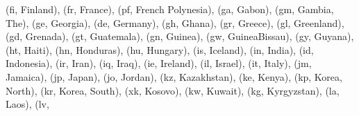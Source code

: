 \documentclass[letterpaper,10pt,english]{sphinxmanual}
\begin{document}
\begin{fulllineitems}
\begin{fulllineitems}
(\textquotesingle{}fi\textquotesingle{}, \textquotesingle{}Finland\textquotesingle{}), (\textquotesingle{}fr\textquotesingle{}, \textquotesingle{}France\textquotesingle{}), (\textquotesingle{}pf\textquotesingle{}, \textquotesingle{}French Polynesia\textquotesingle{}), (\textquotesingle{}ga\textquotesingle{}, \textquotesingle{}Gabon\textquotesingle{}), (\textquotesingle{}gm\textquotesingle{}, \textquotesingle{}Gambia, The\textquotesingle{}), (\textquotesingle{}ge\textquotesingle{}, \textquotesingle{}Georgia\textquotesingle{}), (\textquotesingle{}de\textquotesingle{}, \textquotesingle{}Germany\textquotesingle{}), (\textquotesingle{}gh\textquotesingle{}, \textquotesingle{}Ghana\textquotesingle{}), (\textquotesingle{}gr\textquotesingle{}, \textquotesingle{}Greece\textquotesingle{}), (\textquotesingle{}gl\textquotesingle{}, \textquotesingle{}Greenland\textquotesingle{}), (\textquotesingle{}gd\textquotesingle{}, \textquotesingle{}Grenada\textquotesingle{}), (\textquotesingle{}gt\textquotesingle{}, \textquotesingle{}Guatemala\textquotesingle{}), (\textquotesingle{}gn\textquotesingle{}, \textquotesingle{}Guinea\textquotesingle{}), (\textquotesingle{}gw\textquotesingle{}, \textquotesingle{}Guinea\sphinxhyphen{}Bissau\textquotesingle{}), (\textquotesingle{}gy\textquotesingle{}, \textquotesingle{}Guyana\textquotesingle{}), (\textquotesingle{}ht\textquotesingle{}, \textquotesingle{}Haiti\textquotesingle{}), (\textquotesingle{}hn\textquotesingle{}, \textquotesingle{}Honduras\textquotesingle{}), (\textquotesingle{}hu\textquotesingle{}, \textquotesingle{}Hungary\textquotesingle{}), (\textquotesingle{}is\textquotesingle{}, \textquotesingle{}Iceland\textquotesingle{}), (\textquotesingle{}in\textquotesingle{}, \textquotesingle{}India\textquotesingle{}), (\textquotesingle{}id\textquotesingle{}, \textquotesingle{}Indonesia\textquotesingle{}), (\textquotesingle{}ir\textquotesingle{}, \textquotesingle{}Iran\textquotesingle{}), (\textquotesingle{}iq\textquotesingle{}, \textquotesingle{}Iraq\textquotesingle{}), (\textquotesingle{}ie\textquotesingle{}, \textquotesingle{}Ireland\textquotesingle{}), (\textquotesingle{}il\textquotesingle{}, \textquotesingle{}Israel\textquotesingle{}), (\textquotesingle{}it\textquotesingle{}, \textquotesingle{}Italy\textquotesingle{}), (\textquotesingle{}jm\textquotesingle{}, \textquotesingle{}Jamaica\textquotesingle{}), (\textquotesingle{}jp\textquotesingle{}, \textquotesingle{}Japan\textquotesingle{}), (\textquotesingle{}jo\textquotesingle{}, \textquotesingle{}Jordan\textquotesingle{}), (\textquotesingle{}kz\textquotesingle{}, \textquotesingle{}Kazakhstan\textquotesingle{}), (\textquotesingle{}ke\textquotesingle{}, \textquotesingle{}Kenya\textquotesingle{}), (\textquotesingle{}kp\textquotesingle{}, \textquotesingle{}Korea, North\textquotesingle{}), (\textquotesingle{}kr\textquotesingle{}, \textquotesingle{}Korea, South\textquotesingle{}), (\textquotesingle{}xk\textquotesingle{}, \textquotesingle{}Kosovo\textquotesingle{}), (\textquotesingle{}kw\textquotesingle{}, \textquotesingle{}Kuwait\textquotesingle{}), (\textquotesingle{}kg\textquotesingle{}, \textquotesingle{}Kyrgyzstan\textquotesingle{}), (\textquotesingle{}la\textquotesingle{}, \textquotesingle{}Laos\textquotesingle{}), (\textquotesingle{}lv\textquotesingle{}, 
\end{fulllineitems}
\end{fulllineitems}
\end{document}

